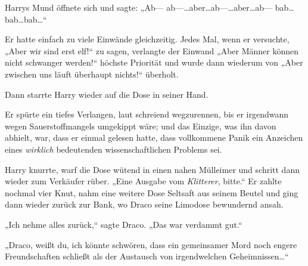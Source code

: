 Harrys Mund öffnete sich und sagte: „Ab— ab—…aber…ab—…aber…ab— bab…bab…bab…“

Er hatte einfach zu viele Einwände gleichzeitig. Jedes Mal, wenn er versuchte, „Aber wir sind erst elf!“ zu sagen, verlangte der Einwand „Aber Männer können nicht schwanger werden!“ höchste Priorität und wurde dann wiederum von „Aber zwischen uns läuft überhaupt nichts!“ überholt.

Dann starrte Harry wieder auf die Dose in seiner Hand.

Er spürte ein tiefes Verlangen, laut schreiend wegzurennen, bis er irgendwann wegen Sauerstoffmangels umgekippt wäre; und das Einzige, was ihn davon abhielt, war, dass er einmal gelesen hatte, dass vollkommene Panik ein Anzeichen eines \emph{wirklich} bedeutenden wissenschaftlichen Problems sei.

Harry knurrte, warf die Dose wütend in einen nahen Mülleimer und schritt dann wieder zum Verkäufer rüber. „Eine Ausgabe vom \emph{Klitterer}, bitte.“ Er zahlte nochmal vier Knut, nahm eine weitere Dose Seltsaft aus seinem Beutel und ging dann wieder zurück zur Bank, wo Draco seine Limodose bewundernd ansah.

„Ich nehme alles zurück,“ sagte Draco. „Das war verdammt gut.“

„Draco, weißt du, ich könnte schwören, dass ein gemeinsamer Mord noch engere Freundschaften schließt als der Austausch von irgendwelchen Geheimnissen…“

